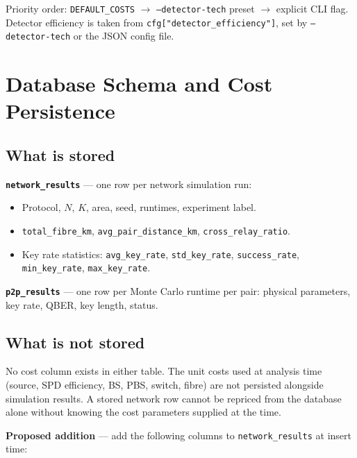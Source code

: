 \documentclass[12pt,a4paper]{article}
\begin{document}
Priority order: \texttt{DEFAULT\_COSTS} $\to$ \texttt{--detector-tech} preset
$\to$ explicit CLI flag. Detector efficiency is taken from
\texttt{cfg["detector\_efficiency"]}, set by \texttt{--detector-tech} or the
JSON config file.

\section{Database Schema and Cost Persistence}

\subsection{What is stored}

\textbf{\texttt{network\_results}} --- one row per network simulation run:
\begin{itemize}
  \item Protocol, $N$, $K$, area, seed, runtimes, experiment label.
  \item \texttt{total\_fibre\_km}, \texttt{avg\_pair\_distance\_km},
        \texttt{cross\_relay\_ratio}.
  \item Key rate statistics: \texttt{avg\_key\_rate}, \texttt{std\_key\_rate},
        \texttt{success\_rate}, \texttt{min\_key\_rate}, \texttt{max\_key\_rate}.
\end{itemize}

\textbf{\texttt{p2p\_results}} --- one row per Monte Carlo runtime per pair:
physical parameters, key rate, QBER, key length, status.

\subsection{What is not stored}

No cost column exists in either table. The unit costs used at analysis time
(source, SPD efficiency, BS, PBS, switch, fibre) are not persisted alongside
simulation results. A stored network row cannot be repriced from the database
alone without knowing the cost parameters supplied at the time.

\textbf{Proposed addition} --- add the following columns to
\texttt{network\_results} at insert time:
\end{document}
